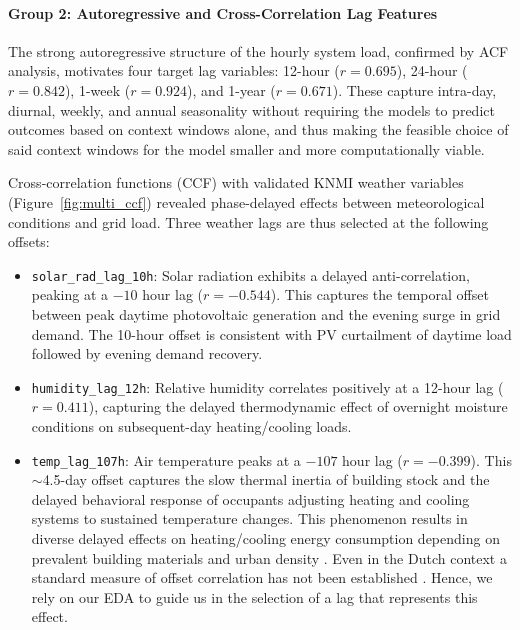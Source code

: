 \paragraph{Group 2: Autoregressive and Cross-Correlation Lag Features}
\label{par:lag_features}

The strong autoregressive structure of the hourly system load, confirmed by ACF analysis, motivates four target lag variables: 12-hour ($r = 0.695$), 24-hour ($r = 0.842$), 1-week ($r = 0.924$), and 1-year ($r = 0.671$). These capture intra-day, diurnal, weekly, and annual seasonality without requiring the models to predict outcomes based on context windows alone, and thus making the feasible choice of said context windows for the model smaller and more computationally viable.

Cross-correlation functions (CCF) with validated KNMI weather variables (Figure~\ref{fig:multi_ccf}) revealed phase-delayed effects between meteorological conditions and grid load. Three weather lags are thus selected at the following offsets:

\begin{itemize}
    \item \texttt{solar\_rad\_lag\_10h}: Solar radiation exhibits a delayed anti-correlation, peaking at a $-10$ hour lag ($r = -0.544$). This captures the temporal offset between peak daytime photovoltaic generation and the evening surge in grid demand. The 10-hour offset is consistent with PV curtailment of daytime load followed by evening demand recovery.
    \item \texttt{humidity\_lag\_12h}: Relative humidity correlates positively at a 12-hour lag ($r = 0.411$), capturing the delayed thermodynamic effect of overnight moisture conditions on subsequent-day heating/cooling loads.
    \item \texttt{temp\_lag\_107h}: Air temperature peaks at a $-107$ hour lag ($r = -0.399$). This $\sim$4.5-day offset captures the slow thermal inertia of building stock and the delayed behavioral response of occupants adjusting heating and cooling systems to sustained temperature changes. This phenomenon results in diverse delayed effects on heating/cooling energy consumption depending on prevalent building materials and urban density \cite{verbeke_thermal_2018}. Even in the Dutch context a standard measure of offset correlation has not been established \cite{hoes_exploring_2010}. Hence, we rely on our EDA to guide us in the selection of a lag that represents this effect.
\end{itemize}


